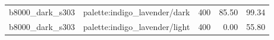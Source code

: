 \begin{longtable}{l>{\raggedright\arraybackslash}p{.42\linewidth}rrr}
b8000\_\allowbreak{}dark\_\allowbreak{}s303 & %
palette:indigo\_\allowbreak{}lavender/dark & %
400 & %
85.50 & %
99.34 \\ %

b8000\_\allowbreak{}dark\_\allowbreak{}s303 & %
palette:indigo\_\allowbreak{}lavender/light & %
400 & %
0.00 & %
55.80 \\ %


\end{longtable}
